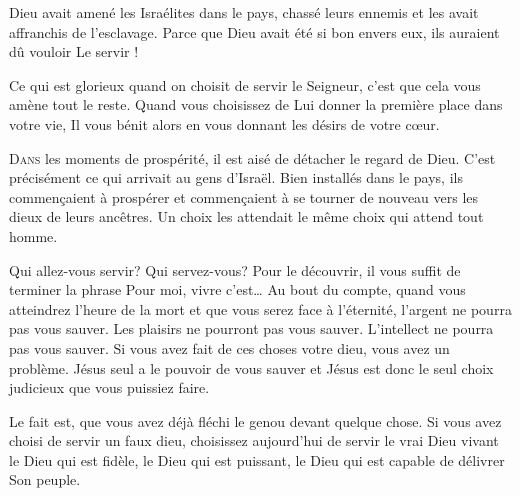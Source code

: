 Dieu avait amené les Israélites dans le pays,
 chassé leurs ennemis et les avait affranchis de l'esclavage.
 Parce que Dieu avait été si bon envers eux, ils auraient dû vouloir Le servir !

Ce qui est glorieux quand on choisit de servir le Seigneur,
 c'est que cela vous amène tout le reste.
 Quand vous choisissez de Lui donner la première place dans votre vie,
 Il vous bénit alors en vous donnant les désirs de votre c\oe{}ur. 

\dvrule






\lettrine{D}{ans} les moments de prospérité,
 il est aisé de détacher le regard de Dieu.
 C'est précisément ce qui arrivait au gens d'Israël.
 Bien installés dans le pays, ils commen\c{c}aient à prospérer
 \ocadr et commen\c{c}aient à se tourner de nouveau vers les dieux
 de leurs ancêtres.
 Un choix les attendait \ocadr le même choix qui attend tout homme.


Qui allez-vous servir? Qui servez-vous? Pour le découvrir,
 il vous suffit de terminer la phrase\frcolon
 \Og Pour moi, vivre c'est\dots{} \Fg{}
 Au bout du compte, quand vous atteindrez l'heure de la mort
 et que vous serez face à l'éternité, l'argent ne pourra pas vous sauver.
 Les plaisirs ne pourront pas vous sauver.
 L'intellect ne pourra pas vous sauver.
 Si vous avez fait de ces choses votre dieu, vous avez un problème.
 Jésus seul a le pouvoir de vous sauver
 et Jésus est donc le seul choix judicieux que vous puissiez faire.

Le fait est, que vous avez déjà fléchi le genou devant quelque chose.
 Si vous avez choisi de servir un faux dieu,
 choisissez aujourd'hui de servir le vrai Dieu vivant
 \ocadr le Dieu qui est fidèle, le Dieu qui est puissant,
 le Dieu qui est capable de délivrer Son peuple. 

